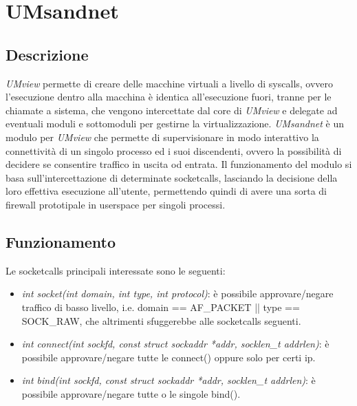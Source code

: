 \chapter{UMsandnet}
\section{Descrizione}

{\em UMview} permette di creare delle macchine virtuali a livello di syscalls, ovvero l'esecuzione dentro alla macchina è identica all'esecuzione fuori, tranne per le chiamate a sistema, che vengono intercettate dal core di {\em UMview} e delegate ad eventuali moduli e sottomoduli per gestirne la virtualizzazione.
{\em UMsandnet} è un modulo per {\em UMview} che permette di supervisionare in modo interattivo la connettività di un singolo processo ed i suoi discendenti, ovvero la possibilità di decidere se consentire traffico in uscita od entrata.
Il funzionamento del modulo si basa sull'intercettazione di determinate socketcalls, lasciando la decisione della loro effettiva esecuzione all'utente, permettendo quindi di avere una sorta di firewall prototipale in userspace per singoli processi.
\section{Funzionamento}
Le socketcalls principali interessate sono le seguenti:
\begin{itemize}
\item {\em int socket(int domain, int type, int protocol)}: è possibile approvare/negare traffico di basso livello, i.e. domain == AF\_PACKET || type == SOCK\_RAW, che altrimenti sfuggerebbe alle socketcalls seguenti.
\item {\em int connect(int sockfd, const struct sockaddr *addr, socklen\_t addrlen)}: è possibile approvare/negare tutte le connect() oppure solo per certi ip.
\item {\em int bind(int sockfd, const struct sockaddr *addr, socklen\_t addrlen)}: è possibile approvare/negare tutte o le singole bind().
\end{itemize}
